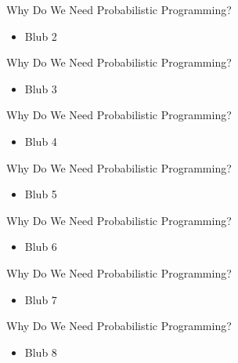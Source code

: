 \documentclass[AERbeamer%
              ,optEnglish%
              ,optBiber%
              ,optBibstyleAlphabetic%
              ,optBeamerClassicFormat%
              ]{AERlatex}%
\begin{document}
\begin{frame}[c]{Why Do We Need Probabilistic Programming?}
    \centering
    \begin{itemize}
        \item Blub 2
    \end{itemize}
\end{frame}


\begin{frame}[c]{Why Do We Need Probabilistic Programming?}
    \centering
    \begin{itemize}
        \item Blub 3
    \end{itemize}
\end{frame}


\begin{frame}[c]{Why Do We Need Probabilistic Programming?}
    \centering
    \begin{itemize}
        \item Blub 4
    \end{itemize}
\end{frame}


\begin{frame}[c]{Why Do We Need Probabilistic Programming?}
    \centering
    \begin{itemize}
        \item Blub 5
    \end{itemize}
\end{frame}


\begin{frame}[c]{Why Do We Need Probabilistic Programming?}
    \centering
    \begin{itemize}
        \item Blub 6
    \end{itemize}
\end{frame}


\begin{frame}[c]{Why Do We Need Probabilistic Programming?}
    \centering
    \begin{itemize}
        \item Blub 7
    \end{itemize}
\end{frame}


\begin{frame}[c]{Why Do We Need Probabilistic Programming?}
    \centering
    \begin{itemize}
        \item Blub 8
    \end{itemize}
\end{frame}
\end{document}
